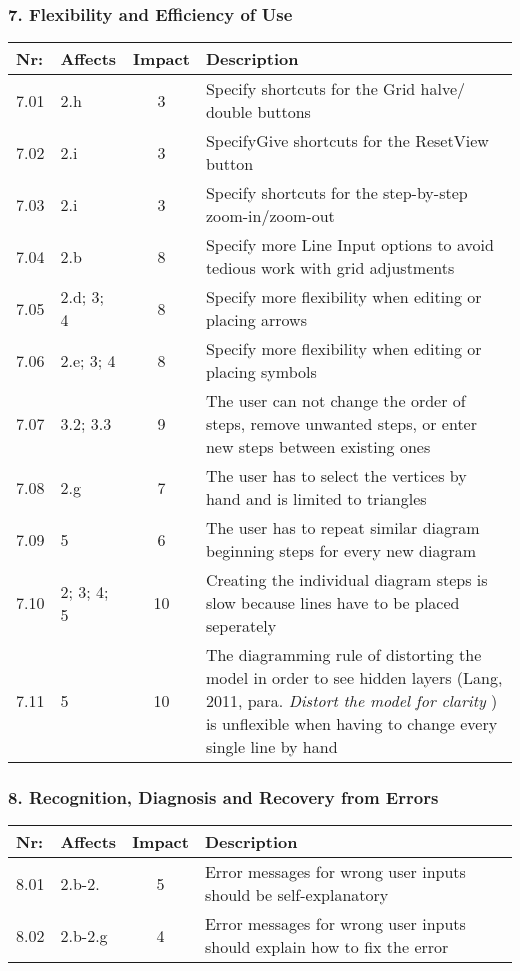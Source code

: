 \subsubsection*{7. Flexibility and Efficiency of Use}
        \begin{tabular}{l | p{} | c | p{}}
        Nr: & Affects & Impact & Description \\ \hline
        7.01 & 2.h & 3 & Specify shortcuts for the Grid halve/ double buttons\\ \hline
        7.02 & 2.i  & 3 & SpecifyGive shortcuts for the ResetView button\\ \hline
        7.03 & 2.i & 3 & Specify shortcuts for the step-by-step zoom-in/zoom-out\\ \hline
        7.04 & 2.b & 8 & Specify more Line Input options to avoid tedious work with grid adjustments\\ \hline
        7.05 & 2.d; 3; 4 & 8 & Specify more flexibility when editing or placing arrows\\ \hline
        7.06 & 2.e; 3; 4 & 8 & Specify more flexibility when editing or placing symbols\\ \hline
        7.07 & 3.2; 3.3 & 9 & The user can not change the order of steps, remove unwanted steps, or enter new steps between existing ones\\ \hline
        7.08 & 2.g & 7 & The user has to select the vertices by hand and is limited to triangles\\ \hline
        7.09 & 5 & 6 & The user has to repeat similar diagram beginning steps for every new diagram\\ \hline
        7.10 & 2; 3; 4; 5 & 10 & Creating the individual diagram steps is slow because lines have to be placed seperately\\ \hline
        7.11 & 5 & 10 & The diagramming rule of distorting the model in order to see hidden layers (Lang, 2011, para. \emph{Distort the model for clarity} \cite{Lang}) is unflexible when having to change every single line by hand\\ \hline
        \end{tabular}

\subsubsection*{8. Recognition, Diagnosis and Recovery from Errors}
        \begin{tabular}{l | p{} | c | p{}}
        Nr: & Affects & Impact & Description \\ \hline
        8.01 & 2.b-2. & 5 & Error messages for wrong user inputs should be self-explanatory\\ \hline
        8.02 & 2.b-2.g & 4 & Error messages for wrong user inputs should explain how to fix the error\\ \hline
        \end{tabular}

